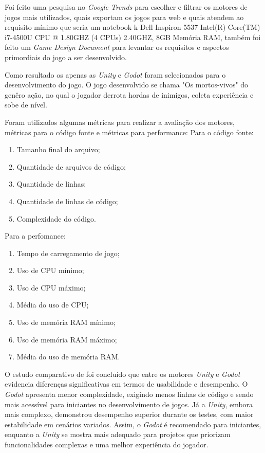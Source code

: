Foi feito uma pesquisa no \textit{Google Trends} para escolher e filtrar os motores de jogos mais utilizados, quais exportam os jogos para web e 
quais atendem ao requisito mínimo que seria um notebook k Dell
Inspiron 5537 Intel(R) Core(TM) i7-4500U CPU @ 1.80GHZ (4 CPUs) 2.40GHZ, 8GB Memória
RAM, também foi feito um \textit{Game Design Document} para levantar os requisitos e aspectos primordiais do jogo a ser desenvolvido.

Como resultado os apenas as \textit{Unity} e \textit{Godot} foram selecionados para o desenvolvimento do jogo.
O jogo desenvolvido se chama "Os mortos-vivos" do genêro ação, no qual o jogador derrota hordas de inimigos, coleta experiência e sobe de nível.

Foram utilizados algumas métricas para realizar a avaliação dos motores, métricas para o código fonte e métricas para performance:
Para o código fonte:
\begin{enumerate}
	\item Tamanho final do arquivo;
	\item Quantidade de arquivos de código;
	\item Quantidade de linhas;
	\item Quantidade de linhas de código;
	\item Complexidade do código.
\end{enumerate} 
Para a perfomance:
\begin{enumerate}
	\item Tempo de carregamento de jogo;
	\item Uso de CPU mínimo;
	\item Uso de CPU máximo;
	\item Média do uso de CPU;
	\item Uso de memória RAM mínimo;
	\item Uso de memória RAM máximo;
	\item Média do uso de memória RAM.
\end{enumerate} 

O estudo comparativo de \cite{pantoja2022jogos} foi concluído que entre os motores \textit{Unity} 
e \textit{Godot} evidencia diferenças significativas em termos de usabilidade e desempenho. 
O \textit{Godot} apresenta menor complexidade, exigindo menos linhas de código e sendo mais 
acessível para iniciantes no desenvolvimento de jogos. Já a \textit{Unity}, embora mais 
complexo, demonstrou desempenho superior durante os testes, com maior 
estabilidade em cenários variados. Assim, o \textit{Godot} é recomendado para iniciantes, 
enquanto a \textit{Unity} se mostra mais adequado para projetos que priorizam funcionalidades 
complexas e uma melhor experiência do jogador.

